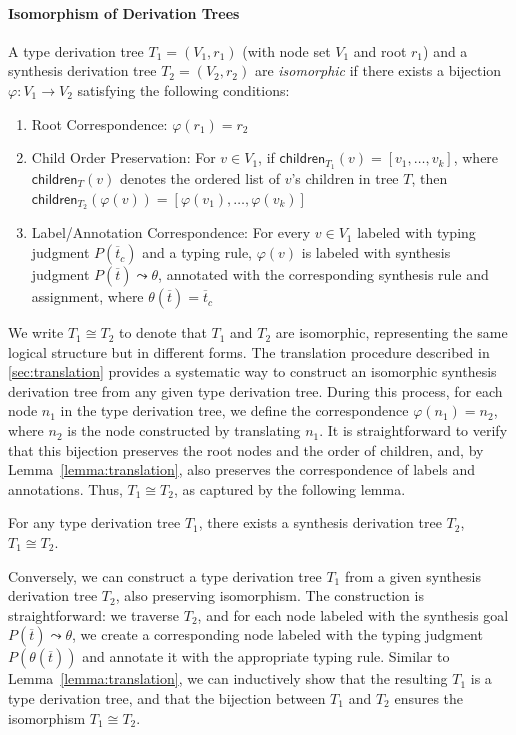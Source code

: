 \documentclass[manuscript,screen]{acmart}
\newcommand{\skhzc}[1]{#1}
\begin{document}
\paragraph{Isomorphism of Derivation Trees}
A type derivation tree $T_1 = (V_1, r_1)$ (with node set $V_1$ and root $r_1$) and a synthesis derivation tree $T_2 = (V_2, r_2)$ are \emph{isomorphic} if there exists a bijection $\varphi: V_1 \to V_2$ satisfying the following conditions:
\begin{enumerate}
    \item Root Correspondence: $\varphi(r_1) = r_2$
    \item Child Order Preservation: For $v \in V_1$, if $\mathsf{children}_{T_1}(v) = [v_1, \ldots, v_k]$, where $\mathsf{children}_{T}(v)$ denotes the ordered list of $v$'s children in tree $T$, then $\mathsf{children}_{T_2}(\varphi(v)) = [\varphi(v_1), \ldots, \varphi(v_k)]$
    \item Label/Annotation Correspondence: For every $v \in V_1$ labeled with typing judgment $P(\overline{t}_c)$ and a typing rule, $\varphi(v)$ is labeled with synthesis judgment $P(\skhzc{\overline{t}}) \leadsto \theta$, annotated with the corresponding synthesis rule and assignment, where $\theta(\skhzc{\overline{t}}) = \overline{t}_c$
\end{enumerate}
We write $T_1 \cong T_2$ to denote that $T_1$ and $T_2$ are isomorphic, representing the same logical structure but in different forms.
%
The translation procedure described in \autoref{sec:translation} provides a systematic way to construct an isomorphic synthesis derivation tree from any given type derivation tree. During this process, for each node $n_1$ in the type derivation tree, we define the correspondence $\varphi(n_1) = n_2$, where $n_2$ is the node constructed by translating $n_1$. It is straightforward to verify that this bijection preserves the root nodes and the order of children, and, by Lemma~\ref{lemma:translation}, also preserves the correspondence of labels and annotations. Thus, $T_1 \cong T_2$, as captured by the following lemma.

\begin{lemma}
\label{lemma:isomorphism1}
For any type derivation tree $T_1$, there exists a synthesis derivation tree $T_2$, $T_1 \cong T_2$.
\end{lemma}

Conversely, we can construct a type derivation tree $T_1$ from a given synthesis derivation tree $T_2$, also preserving isomorphism. The construction is straightforward: we traverse $T_2$, and for each node labeled with the synthesis goal $P(\overline{t}) \leadsto \theta$, we create a corresponding node labeled with the typing judgment $P(\theta(\overline{t}))$ and annotate it with the appropriate typing rule. Similar to Lemma~\ref{lemma:translation}, we can inductively show that the resulting $T_1$ is a type derivation tree, and that the bijection between $T_1$ and $T_2$ ensures the isomorphism $T_1 \cong T_2$.
\end{document}
